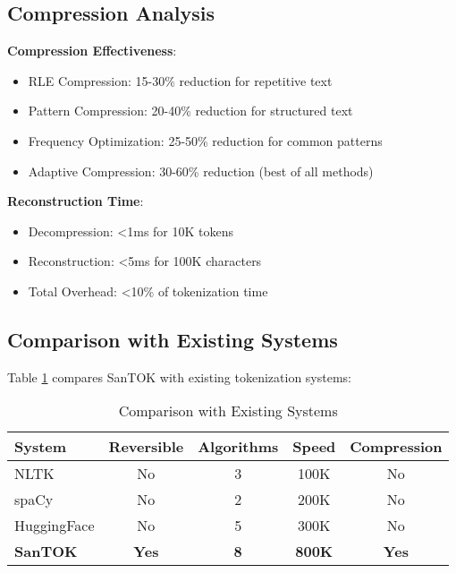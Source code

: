 \documentclass[conference]{IEEEtran}
\begin{document}
\subsection{Compression Analysis}

\textbf{Compression Effectiveness}:
\begin{itemize}
    \item RLE Compression: 15-30\% reduction for repetitive text
    \item Pattern Compression: 20-40\% reduction for structured text
    \item Frequency Optimization: 25-50\% reduction for common patterns
    \item Adaptive Compression: 30-60\% reduction (best of all methods)
\end{itemize}

\textbf{Reconstruction Time}:
\begin{itemize}
    \item Decompression: <1ms for 10K tokens
    \item Reconstruction: <5ms for 100K characters
    \item Total Overhead: <10\% of tokenization time
\end{itemize}

\subsection{Comparison with Existing Systems}

Table \ref{tab:comparison} compares SanTOK with existing tokenization systems:

\begin{table}[htbp]
\caption{Comparison with Existing Systems}
\label{tab:comparison}
\begin{center}
\begin{tabular}{|l|c|c|c|c|}
\hline
\textbf{System} & \textbf{Reversible} & \textbf{Algorithms} & \textbf{Speed} & \textbf{Compression} \\
\hline
NLTK & No & 3 & 100K & No \\
spaCy & No & 2 & 200K & No \\
HuggingFace & No & 5 & 300K & No \\
\textbf{SanTOK} & \textbf{Yes} & \textbf{8} & \textbf{800K} & \textbf{Yes} \\
\hline
\end{tabular}
\end{center}
\end{table}
\end{document}
